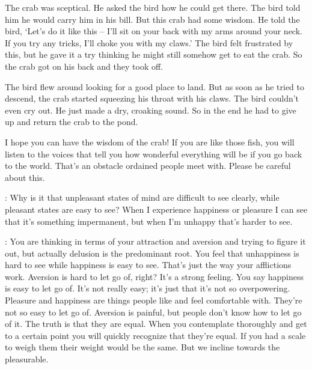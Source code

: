 The crab was sceptical. He asked the bird how he could get there. The bird told him he would carry him in his bill. But this crab had some wisdom. He told the bird, `Let's do it like this -- I'll sit on your back with my arms around your neck. If you try any tricks, I'll choke you with my claws.' The bird felt frustrated by this, but he gave it a try thinking he might still somehow get to eat the crab. So the crab got on his back and they took off.

The bird flew around looking for a good place to land. But as soon as he tried to descend, the crab started squeezing his throat with his claws. The bird couldn't even cry out. He just made a dry, croaking sound. So in the end he had to give up and return the crab to the pond.

I hope you can have the wisdom of the crab! If you are like those fish, you will listen to the voices that tell you how wonderful everything will be if you go back to the world. That's an obstacle ordained people meet with. Please be careful about this.

: Why is it that unpleasant states of mind are difficult to see clearly, while pleasant states are easy to see? When I experience happiness or pleasure I can see that it's something impermanent, but when I'm unhappy that's harder to see.

: You are thinking in terms of your attraction and aversion and trying to figure it out, but actually delusion is the predominant root. You feel that unhappiness is hard to see while happiness is easy to see. That's just the way your afflictions work. Aversion is hard to let go of, right? It's a strong feeling. You say happiness is easy to let go of. It's not really easy; it's just that it's not so overpowering. Pleasure and happiness are things people like and feel comfortable with. They're not so easy to let go of. Aversion is painful, but people don't know how to let go of it. The truth is that they are equal. When you contemplate thoroughly and get to a certain point you will quickly recognize that they're equal. If you had a scale to weigh them their weight would be the same. But we incline towards the pleasurable.

